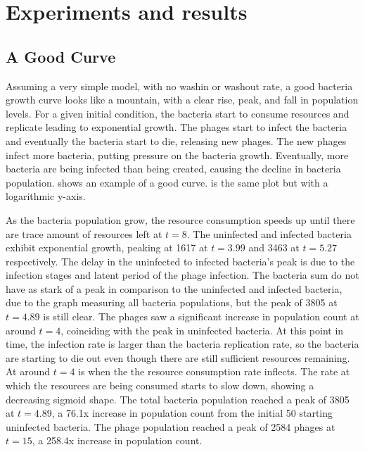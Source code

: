 \chapter{Experiments and results}
\label{AER}

\section{A Good Curve}
Assuming a very simple model, with no washin or washout rate, a good bacteria growth curve looks like a mountain, with a clear rise, peak, and fall in population levels. 
For a given initial condition, the bacteria start to consume resources and replicate leading to exponential growth. 
The phages start to infect the bacteria and eventually the bacteria start to die, releasing new phages. 
The new phages infect more bacteria, putting pressure on the bacteria growth. 
Eventually, more bacteria are being infected than being created, causing the decline in bacteria population. 
 shows an example of a good curve. 
 is the same plot but with a logarithmic y-axis. 

As the bacteria population grow, the resource consumption speeds up until there are trace amount of resources left at $t=8$. 
The uninfected and infected bacteria exhibit exponential growth, peaking at 1617 at $t=3.99$ and 3463 at $t=5.27$ respectively. 
The delay in the uninfected to infected bacteria's peak is due to the infection stages and latent period of the phage infection. 
The bacteria sum do not have as stark of a peak in comparison to the uninfected and infected bacteria, due to the graph measuring all bacteria populations, but the peak of 3805 at $t=4.89$ is still clear. 
The phages saw a significant increase in population count at around $t=4$, coinciding with the peak in uninfected bacteria. 
At this point in time, the infection rate is larger than the bacteria replication rate, so the bacteria are starting to die out even though there are still sufficient resources remaining. 
At around $t=4$ is when the the resource consumption rate inflects. 
The rate at which the resources are being consumed starts to slow down, showing a decreasing sigmoid shape. 
The total bacteria population reached a peak of 3805 at $t=4.89$, a 76.1x increase in population count from the initial 50 starting uninfected bacteria. 
The phage population reached a peak of 2584 phages at $t=15$, a 258.4x increase in population count. 


